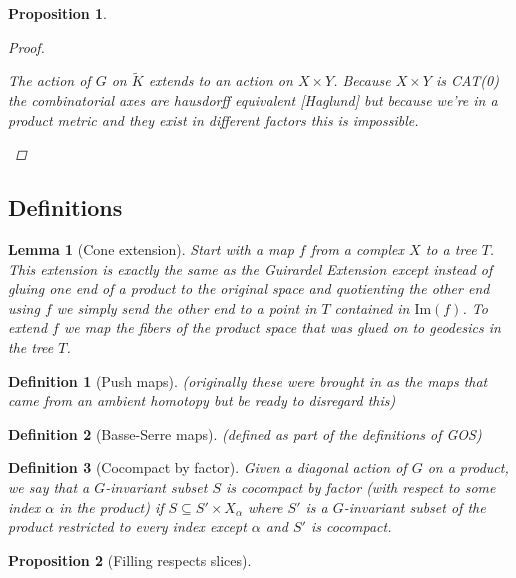 \documentclass{article}
\theoremstyle{mystyle}
\newtheorem{lem}{Lemma}[section]
\newtheorem{pro}{Proposition}[section]
\newtheorem{defn}{Definition}[section]
\theoremstyle{remark}
\begin{document}
\begin{pro}
\begin{proof}
\begin{enumerate}
    The action of $G$ on $\widetilde{K}$ extends to an action on $X \times Y$. Because $X\times Y$ is CAT(0) the combinatorial axes are hausdorff equivalent [Haglund] but because we're in a product metric and they exist in different factors this is impossible.
    
\end{enumerate}
\end{proof}
\end{pro}




\subsection{Definitions}


\begin{lem}
    [Cone extension]
    \label{lem:coneextension}
    Start with a map $f$ from a complex $X$ to a tree $T$. This extension is exactly the same as the Guirardel Extension except instead of gluing one end of a product to the original space and quotienting the other end using $f$ we simply send the other end to a point in $T$ contained in \(\text{Im}(f)\). To extend $f$ we map the fibers of the product space that was glued on to geodesics in the tree $T$.
\end{lem}

\begin{defn}
    [Push maps]
    \label{defn:pushmaps}
    (originally these were brought in as the maps that came from an ambient homotopy but be ready to disregard this)
\end{defn}

\begin{defn}
    [Basse-Serre maps]
    \label{defn:basseserremaps}
    (defined as part of the definitions of GOS)
\end{defn}

\begin{defn}
    [Cocompact by factor]
    \label{defn:cocompactcrossfactor} 
    Given a diagonal action of \(G\) on a product, we say that a \(G\)-invariant subset \(S\) is cocompact by factor (with respect to some index \(\alpha\) in the product) if \(S \subseteq  S' \times X_{\alpha}\) where \(S'\) is a \(G\)-invariant subset of the product restricted to every index except \(\alpha\) and \(S'\) is cocompact.
\end{defn}

\begin{pro}
    [Filling respects slices]
    \label{pro:fillingrespectsslices} 
\end{pro}
\end{document}
